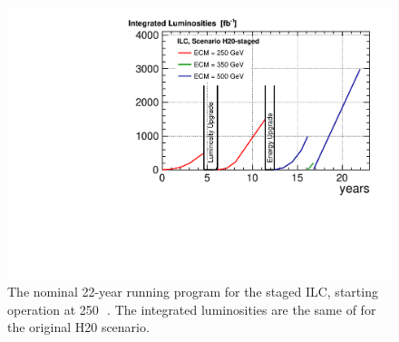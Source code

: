 \begin{figure}
\begin{center}
\includegraphics[width=0.75\hsize]{figs/lumi_H20-staged}
\end{center}
\caption{The nominal 22-year running program for the staged ILC, starting operation at 250\,\GeV ~\cite{ILC250}. The integrated luminosities are the same of for the original H20 scenario.}
\label{fig:H20}
\end{figure}
